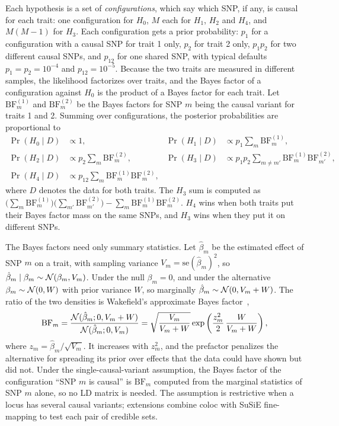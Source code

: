 Each hypothesis is a set of \emph{configurations}, which say which SNP, if any, is causal for each trait: one configuration for $H_0$, $M$ each for $H_1$, $H_2$ and $H_4$, and $M(M-1)$ for $H_3$. Each configuration gets a prior probability: $p_1$ for a configuration with a causal SNP for trait 1 only, $p_2$ for trait 2 only, $p_1p_2$ for two different causal SNPs, and $p_{12}$ for one shared SNP, with typical defaults $p_1=p_2=10^{-4}$ and $p_{12}=10^{-5}$. Because the two traits are measured in different samples, the likelihood factorizes over traits, and the Bayes factor of a configuration against $H_0$ is the product of a Bayes factor for each trait. Let $\text{BF}^{(1)}_m$ and $\text{BF}^{(2)}_m$ be the Bayes factors for SNP $m$ being the causal variant for traits 1 and 2. Summing over configurations, the posterior probabilities are proportional to
\begin{align}
  \Pr(H_0\mid D) &\propto 1, &
  \Pr(H_1\mid D) &\propto p_1\sum_m \text{BF}^{(1)}_m, \nonumber\\
  \Pr(H_2\mid D) &\propto p_2\sum_m \text{BF}^{(2)}_m, &
  \Pr(H_3\mid D) &\propto p_1p_2\sum_{m\neq m'}\text{BF}^{(1)}_m\text{BF}^{(2)}_{m'}, \nonumber\\
  \Pr(H_4\mid D) &\propto p_{12}\sum_m\text{BF}^{(1)}_m\text{BF}^{(2)}_m,
\end{align}
where $D$ denotes the data for both traits. The $H_3$ sum is computed as $\big(\sum_m\text{BF}^{(1)}_m\big)\big(\sum_{m'}\text{BF}^{(2)}_{m'}\big)-\sum_m\text{BF}^{(1)}_m\text{BF}^{(2)}_m$. $H_4$ wins when both traits put their Bayes factor mass on the same SNPs, and $H_3$ wins when they put it on different SNPs.

The Bayes factors need only summary statistics. Let $\hat\beta_m$ be the estimated effect of SNP $m$ on a trait, with sampling variance $V_m=\text{se}(\hat\beta_m)^2$, so $\hat\beta_m\mid\beta_m\sim\mathcal{N}(\beta_m,V_m)$. Under the null $\beta_m=0$, and under the alternative $\beta_m\sim\mathcal{N}(0,W)$ with prior variance $W$, so marginally $\hat\beta_m\sim\mathcal{N}(0,V_m+W)$. The ratio of the two densities is Wakefield's approximate Bayes factor~\citep{wakefield2009},
\begin{equation}
  \text{BF}_m = \frac{\mathcal{N}(\hat\beta_m;0,V_m+W)}{\mathcal{N}(\hat\beta_m;0,V_m)} = \sqrt{\frac{V_m}{V_m+W}}\exp\left(\frac{z_m^2}{2}\,\frac{W}{V_m+W}\right),
  \label{eq:abf-12}
\end{equation}
where $z_m=\hat\beta_m/\sqrt{V_m}$. It increases with $z_m^2$, and the prefactor penalizes the alternative for spreading its prior over effects that the data could have shown but did not. Under the single-causal-variant assumption, the Bayes factor of the configuration ``SNP $m$ is causal'' is $\text{BF}_m$ computed from the marginal statistics of SNP $m$ alone, so no LD matrix is needed. The assumption is restrictive when a locus has several causal variants; extensions combine coloc with SuSiE fine-mapping to test each pair of credible sets.

